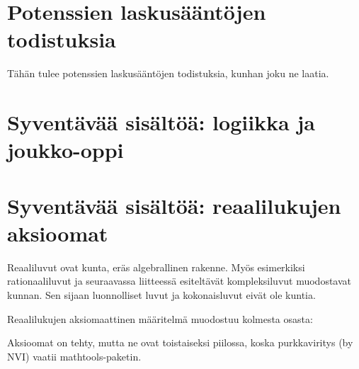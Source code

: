 \chapter{Potenssien laskusääntöjen todistuksia}
\label{pot_todistukset}

Tähän tulee potenssien laskusääntöjen todistuksia, kunhan joku ne laatia.
\chapter{Syventävää sisältöä: logiikka ja joukko-oppi}
\chapter{Syventävää sisältöä: reaalilukujen aksioomat}
\label{aksioomat}
Reaaliluvut ovat kunta, eräs algebrallinen rakenne. Myös esimerkiksi rationaaliluvut ja seuraavassa liitteessä esiteltävät kompleksiluvut muodostavat kunnan. Sen sijaan luonnolliset luvut ja kokonaisluvut eivät ole kuntia.

Reaalilukujen aksiomaattinen määritelmä muodostuu kolmesta osasta:

Aksioomat on tehty, mutta ne ovat toistaiseksi piilossa, koska purkkaviritys (by NVI) vaatii mathtools-paketin.


